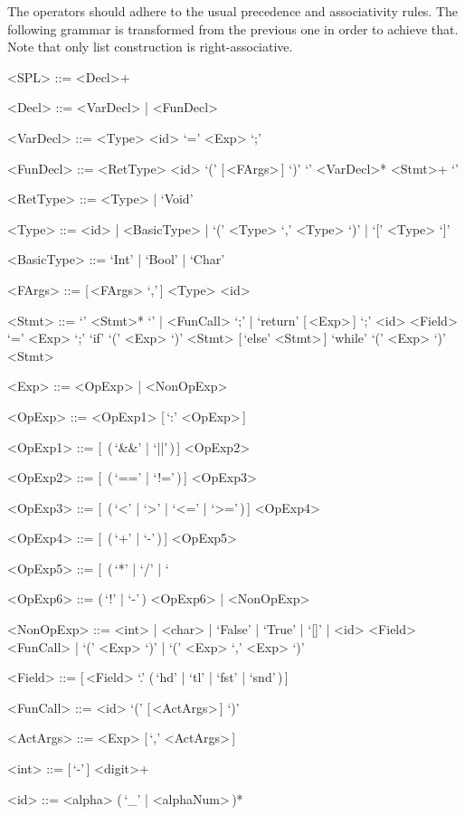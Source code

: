 \documentclass{article}
\begin{document}
The operators should adhere to the usual precedence and associativity rules.
The following grammar is transformed from the previous one in order to achieve that.
Note that only list construction is right-associative.
\setlength{\grammarindent}{7.1em}
\begin{grammar}
    <SPL> ::= <Decl>+

    <Decl> ::= <VarDecl> | <FunDecl>

    <VarDecl> ::= <Type> <id> `=' <Exp> `;'

    <FunDecl> ::= <RetType> <id> `(' [\,<FArgs>\,] `)' `{' <VarDecl>* <Stmt>+ `}'

    <RetType> ::= <Type> | `Void'

    <Type> ::= <id> | <BasicType> | `(' <Type> `,' <Type> `)' | `[' <Type> `]'

    <BasicType> ::= `Int' | `Bool' | `Char'

    <FArgs> ::= [\,<FArgs> `,'\,] <Type> <id>

    <Stmt> ::= `{' <Stmt>* `}' | <FunCall> `;' | `return' [\,<Exp>\,] `;'
    \alt <id> <Field> `=' <Exp> `;'
    \alt `if' `(' <Exp> `)' <Stmt> [\,`else' <Stmt>\,]
    \alt `while' `(' <Exp> `)' <Stmt>

    <Exp> ::= <OpExp> | <NonOpExp>

    <OpExp> ::= <OpExp1> [\,`:' <OpExp>\,]

    <OpExp1> ::= [\,<OpExp1> (\,`&&' | `||'\,)\,] <OpExp2>

    <OpExp2> ::= [\,<OpExp2> (\,`==' | `!='\,)\,] <OpExp3>

    <OpExp3> ::= [\,<OpExp3> (\,`<' | `>' | `<=' | `>='\,)\,] <OpExp4>

    <OpExp4> ::= [\,<OpExp4> (\,`+' | `-'\,)\,] <OpExp5>

    <OpExp5> ::= [\,<OpExp5> (\,`*' | `/' | `%

    <OpExp6> ::= (\,`!' | `-'\,) <OpExp6> | <NonOpExp>

    <NonOpExp> ::= <int> | <char> | `False' | `True' | `[]' | <id> <Field>
    \alt <FunCall> | `(' <Exp> `)' | `(' <Exp> `,' <Exp> `)'

    <Field> ::= [\,<Field> `.' (\,`hd' | `tl' | `fst' | `snd'\,)\,]

    <FunCall> ::= <id> `(' [\,<ActArgs>\,] `)'

    <ActArgs> ::= <Exp> [\,`,' <ActArgs>\,]

    <int> ::= [\,`-'\,] <digit>+

    <id> ::= <alpha> (\,`_' | <alphaNum>\,)*
\end{grammar}
\end{document}
